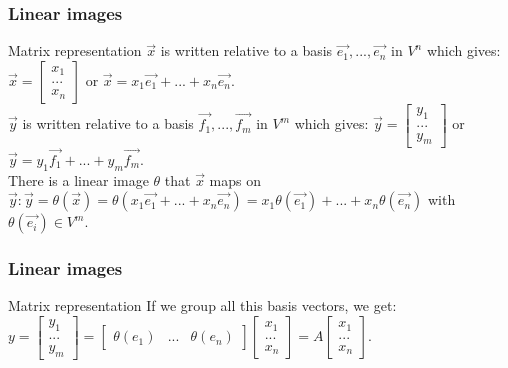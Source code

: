 \begin{frame}
	\frametitle{Linear images}
	\begin{block}{Matrix representation}
		$\overrightarrow{x}$ is written relative to a basis $\overrightarrow{e_1},...,\overrightarrow{e_n}$ in $V^n$ which gives: $\overrightarrow{x}=\begin{bmatrix}
		x_1\\...\\x_n
		\end{bmatrix}$ or $ \overrightarrow{x}=x_1\overrightarrow{e_1}+...+x_n\overrightarrow{e_n}$.\\ $\overrightarrow{y}$ is written relative to a basis $\overrightarrow{f_1},...,\overrightarrow{f_m}$ in $V^m$ which gives: $\overrightarrow{y}=\begin{bmatrix}
		y_1\\...\\y_m
		\end{bmatrix}$ or $ \overrightarrow{y}=y_1\overrightarrow{f_1}+...+y_m\overrightarrow{f_m}$. \\
		There is a linear image $\theta$ that $\overrightarrow{x}$ maps on $\overrightarrow{y}:\overrightarrow{y}=\theta(\overrightarrow{x})=\theta(x_1\overrightarrow{e_1}+...+x_n\overrightarrow{e_n})=x_1\theta(\overrightarrow{e_1})+...+x_n\theta(\overrightarrow{e_n})$ with $\theta(\overrightarrow{e_i})\in V^m$.
	\end{block}
\end{frame}

\begin{frame}
	\frametitle{Linear images}
	\begin{block}{Matrix representation}
		If we group all this basis vectors, we get: $y=\begin{bmatrix}
		y_1\\...\\y_m \end{bmatrix}=\begin{bmatrix}
		\theta(e_1) & ... & \theta(e_n)
		\end{bmatrix}\begin{bmatrix}
		x_1\\...\\x_n
		\end{bmatrix}=A\begin{bmatrix}
		x_1\\...\\x_n
		\end{bmatrix}$.\\
		\vspace{4mm}
	\end{block}
\end{frame}

